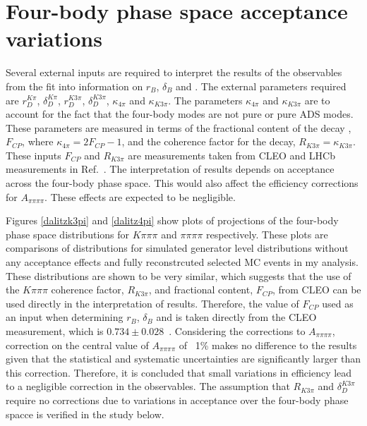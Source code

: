 \section{Four-body phase space acceptance variations}
\label{sec:interpretation:inputs}

Several external inputs are required to interpret the results of the \CP observables from the \CP fit into information on $r_B$, $\delta_B$ and \Pgamma. The external parameters required are $r_D^{K\pi}$, $\delta_D^{K\pi}$, $r_D^{K3\pi}$, $\delta_D^{K3\pi}$, $\kappa_{4\pi}$ and $\kappa_{K3\pi}$. The parameters $\kappa_{4\pi}$ and $\kappa_{K3\pi}$ are to account for the fact that the four-body modes are not pure \CP or pure ADS modes. These parameters are measured in terms of the fractional \CP content of the decay \decay{\Dz}{\pip\pim\pip\pim}, $F_{CP}$, where $\kappa_{4\pi} = 2F_{CP} - 1$, and the coherence factor for the \decay{\Dz}{\Km\pip\pim\pip} decay, $R_{K3\pi} = \kappa_{K3\pi}$. These inputs $F_{CP}$ and $R_{K3\pi}$ are measurements taken from CLEO and LHCb measurements in Ref.~\cite{charmk3pi,LHCb-PAPER-2015-057,charm4pi}. The interpretation of \lhcb results depends on \lhcb acceptance across the four-body phase space. This would also affect the efficiency corrections for $A_{\pi\pi\pi\pi}$. These effects are expected to be negligible.

Figures \ref{dalitzk3pi} and \ref{dalitz4pi} show plots of projections of the four-body phase space distributions for $K\pi\pi\pi$ and $\pi\pi\pi\pi$ respectively. These plots are comparisons of distributions for simulated generator level distributions without any acceptance effects and fully reconstrcuted selected MC events in my analysis. These distributions are shown to be very similar, which suggests that the use of the $K\pi\pi\pi$ coherence factor, $R_{K3\pi}$, and fractional \CP content, $F_{CP}$, from CLEO can be used directly in the interpretation of \lhcb results. Therefore, the value of $F_{CP}$ used as an input when determining $r_B$, $\delta_B$ and \Pgamma is taken directly from the CLEO measurement, which is $0.734 \pm 0.028$~\cite{charm4pi}. Considering the corrections to $A_{\pi\pi\pi\pi}$, correction on the central value of $A_{\pi\pi\pi\pi}$ of ~1\% makes no difference to the results given that the statistical and systematic uncertainties are significantly larger than this correction. Therefore, it is concluded that small variations in efficiency lead to a negligible correction in the observables. The assumption that $R_{K3\pi}$ and $\delta_D^{K3\pi}$ require no corrections due to variations in acceptance over the four-body phase spacce is verified in the study below.

